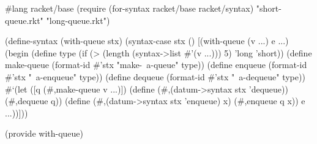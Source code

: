 \begin{schemedisplay}
#lang racket/base
(require (for-syntax racket/base
                     racket/syntax)
         "short-queue.rkt"
         "long-queue.rkt")

(define-syntax (with-queue stx)
  (syntax-case stx ()
    [(with-queue (v ...) e ...)
     (begin
       (define type 
         (if (> (length (syntax->list #'(v ...))) 5) 
	     'long 
             'short))
       (define make-queue 
         (format-id #'stx "make-~a-queue" type))
       (define enqueue (format-id #'stx "~a-enqueue" type))
       (define dequeue (format-id #'stx "~a-dequeue" type))
       #`(let ([q (#,make-queue v ...)])
           (define (#,(datum->syntax stx 'dequeue)) 
             (#,dequeue q))
           (define (#,(datum->syntax stx 'enqueue) x)
             (#,enqueue q x))
           e ...))]))

(provide with-queue)
\end{schemedisplay} 
